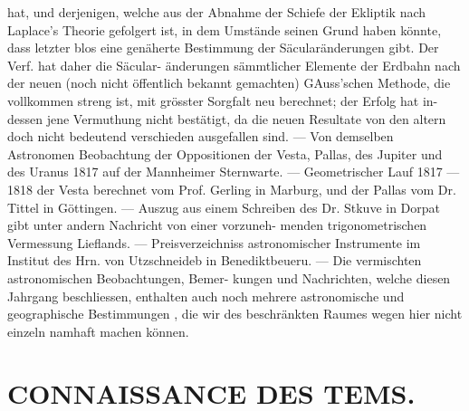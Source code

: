 \documentclass[12pt,a4paper]{article}
\begin{document}
{{{{{{{{ hat,  und  derjenigen,  welche  aus  der  Abnahme  der  Schiefe der  Ekliptik  nach  Laplace's  Theorie  gefolgert  ist,  in  dem  Umstände  seinen  Grund  haben  könnte,  dass letzter  blos  eine  genäherte  Bestimmung  der  Säcularänderungen  gibt.  Der  Verf.  hat  daher  die  Säcular- änderungen  sämmtlicher  Elemente  der  Erdbahn  nach  der  neuen  (noch  nicht  öffentlich  bekannt  gemachten) GAuss'schen  Methode,  die  vollkommen  streng  ist,  mit  grösster  Sorgfalt  neu  berechnet;  der  Erfolg  hat  in- dessen jene  Vermuthung  nicht  bestätigt,  da  die  neuen  Resultate  von  den  altern  doch  nicht  bedeutend verschieden  ausgefallen  sind.  ---  Von  demselben  Astronomen  Beobachtung  der  Oppositionen  der  Vesta, Pallas,  des  Jupiter  und  des  Uranus  1817  auf  der  Mannheimer  Sternwarte.  ---  Geometrischer  Lauf  1817 --- 1818  der  Vesta  berechnet  vom  Prof.  Gerling  in  Marburg,  und  der  Pallas  vom  Dr.  Tittel  in  Göttingen. --- Auszug  aus  einem  Schreiben  des  Dr.  Stkuve  in  Dorpat  gibt  unter  andern  Nachricht  von  einer  vorzuneh- menden trigonometrischen  Vermessung  Lieflands. ---  Preisverzeichniss  astronomischer  Instrumente  im  Institut des  Hrn.  von  Utzschneideb  in  Benediktbeueru. ---  Die  vermischten  astronomischen  Beobachtungen,  Bemer- kungen und  Nachrichten,  welche  diesen  Jahrgang  beschliessen,  enthalten  auch  noch  mehrere  astronomische und  geographische  Bestimmungen ,  die  wir  des  beschränkten  Raumes  wegen  hier  nicht  einzeln  namhaft machen  können.


\section*{CONNAISSANCE  DES  TEMS.}

}}}}}}}}
\end{document}
